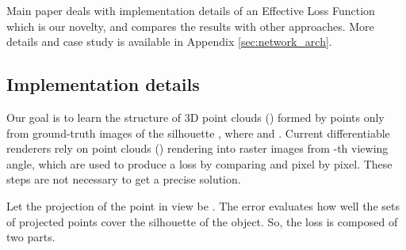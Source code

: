\documentclass[runningheads]{llncs}
\begin{document}
 Main paper deals with implementation details of an Effective Loss Function  which is our novelty, and compares the results with other approaches. More details and case study is available in Appendix \textcolor{blue}{\ref{sec:network_arch}}.

\subsection{Implementation details}

Our goal is to learn the structure of 3D point clouds () formed by  points  only from  ground-truth images of the silhouette , where    and   . Current differentiable renderers rely on point clouds () rendering into raster images  from -th viewing angle, which are used to produce a loss by comparing  and  pixel by pixel. These steps are not necessary to get a precise solution.

Let the projection of the point  in view  be . The error evaluates how well the sets of projected points  cover the silhouette of the object. So, the loss is composed of two parts.
\end{document}
